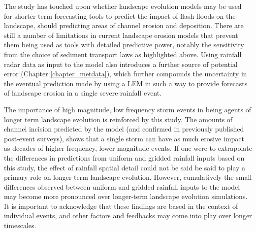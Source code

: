 The study has touched upon whether landscape evolution models may be used for shorter-term forecasting tools to predict the impact of flash floods on the landscape, should predicting areas of channel erosion and deposition. There are still a number of limitations in current landscape erosion models that prevent them being used as tools with detailed predictive power, notably the sensitivity from the choice of sediment transport laws as highlighted above. Using rainfall radar data as input to the model also introduces a further source of potential error (Chapter \ref{chapter_metdata}), which further compounds the uncertainty in the eventual prediction made by using a LEM in such a way to provide forecasts of landscape erosion in a single severe rainfall event. 

The importance of high magnitude, low frequency storm events in being agents of longer term landscape evolution is reinforced by this study. The amounts of channel incision predicted by the model (and confirmed in previously published post-event surveys), shows that a single storm can have as much erosive impact as decades of higher frequency, lower magnitude events. If one were to extrapolate the differences in predictions from uniform and gridded rainfall inputs based on this study, the effect of rainfall spatial detail could not be said be said to play a primary role on longer term landscape evolution. However, cumulatively the small differences observed between uniform and gridded rainfall inputs to the model may become more pronounced over longer-term landscape evolution simulations. It is important to acknowledge that these findings are based in the context of individual events, and other factors and feedbacks may come into play over longer timescales.










